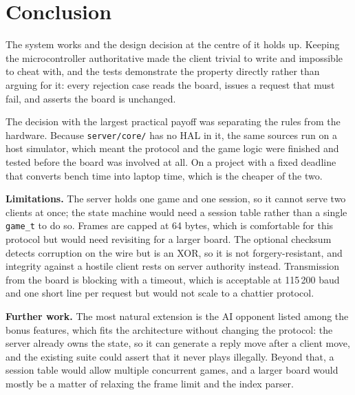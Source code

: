 \section{Conclusion}
\label{sec:conclusion}

The system works and the design decision at the centre of it holds up. Keeping
the microcontroller authoritative made the client trivial to write and
impossible to cheat with, and the tests demonstrate the property directly rather
than arguing for it: every rejection case reads the board, issues a request that
must fail, and asserts the board is unchanged.

The decision with the largest practical payoff was separating the rules from the
hardware. Because \texttt{server/core/} has no HAL in it, the same sources run
on a host simulator, which meant the protocol and the game logic were finished
and tested before the board was involved at all. On a project with a fixed
deadline that converts bench time into laptop time, which is the cheaper of the
two.

\textbf{Limitations.} The server holds one game and one session, so it cannot
serve two clients at once; the state machine would need a session table rather
than a single \texttt{game\_t} to do so. Frames are capped at 64 bytes, which is
comfortable for this protocol but would need revisiting for a larger board. The
optional checksum detects corruption on the wire but is an XOR, so it is not
forgery-resistant, and integrity against a hostile client rests on server
authority instead. Transmission from the board is blocking with a timeout, which
is acceptable at 115\,200 baud and one short line per request but would not
scale to a chattier protocol.

\textbf{Further work.} The most natural extension is the AI opponent listed
among the bonus features, which fits the architecture without changing the
protocol: the server already owns the state, so it can generate a reply move
after a client move, and the existing suite could assert that it never plays
illegally. Beyond that, a session table would allow multiple concurrent games,
and a larger board would mostly be a matter of relaxing the frame limit and the
index parser.
